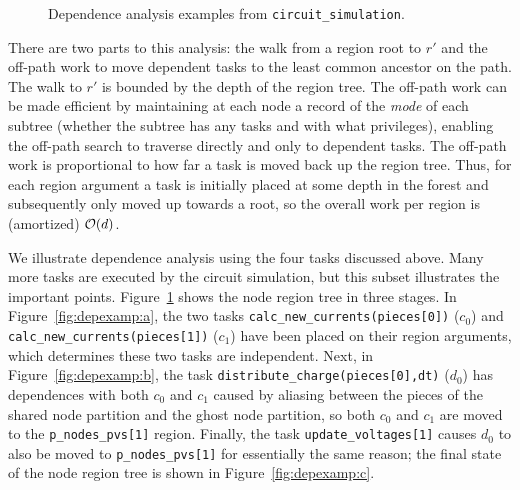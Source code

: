 \begin{figure}
{\label{fig:depexamp:c}
}
\vspace{-2mm}
\caption{Dependence analysis examples from {\tt circuit\_simulation}. \label{fig:depexamp}}
\vspace{-6mm}
\end{figure}

There are two parts to this analysis:
the walk from a region root to $r'$ and the off-path work
to move dependent tasks to the least common ancestor on the path.
The walk to $r'$ is bounded by the depth of the region tree.
The off-path work can be made efficient by maintaining at each node a
record of the {\em mode} of each subtree (whether the subtree has any tasks and with what privileges),
enabling the off-path search to traverse directly and only to
dependent tasks.  The off-path work is proportional to how far a task
is moved back up the region tree.  Thus, for each region argument a
task is initially placed at some depth in the forest and subsequently
only moved up towards a root, so the overall work per region is (amortized)
${\cal O}(d)$.  

We illustrate dependence analysis using the four tasks discussed
above.  Many more tasks are executed by the circuit simulation,
but this subset illustrates the important
points. Figure~\ref{fig:depexamp} shows the node region tree in three
stages.  In Figure~\ref{fig:depexamp:a}, the two tasks
{\tt calc\_new\_currents(pieces[0])} ($c_0$) and {\tt
    calc\_new\_currents(pieces[1])} ($c_1$) have been placed on their region arguments,
  which determines these two tasks are independent.
Next, in Figure~\ref{fig:depexamp:b}, the task {\tt distribute\_charge(pieces[0],dt)} ($d_0$)
has dependences with both $c_0$ and $c_1$ caused by aliasing between the pieces of the
shared node partition and the ghost node partition, so both $c_0$ and $c_1$ are moved to
the {\tt p\_nodes\_pvs[1]} region.  Finally, the task {\tt update\_voltages[1]} causes
$d_0$ to also be moved to {\tt p\_nodes\_pvs[1]} for essentially the same reason; the final
state of the node region tree is shown in Figure~\ref{fig:depexamp:c}.


